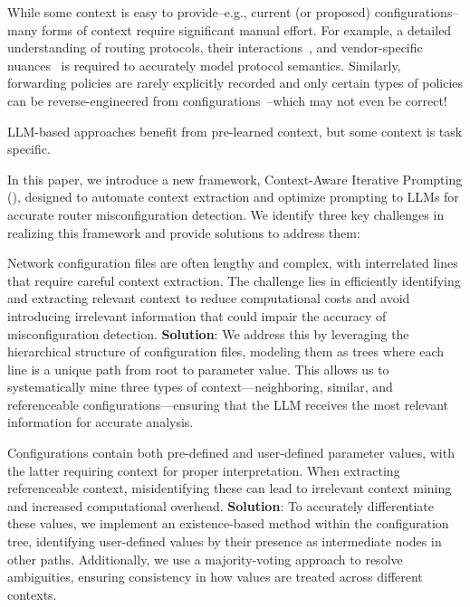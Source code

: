 While some context is easy to provide--e.g., current (or proposed) configurations--many forms of context require significant manual effort. For example, a detailed understanding of routing protocols, their interactions~\cite{le2007rr}, and vendor-specific nuances~\cite{birkner2021metha} is required to accurately model protocol semantics. Similarly, forwarding policies are rarely explicitly recorded and only certain types of policies can be reverse-engineered from configurations~\cite{birkner2020config2spec, kheradmand2020anime}--which may not even be correct!

LLM-based approaches benefit from pre-learned context, but some context is task specific. 

In this paper, we introduce a new framework, Context-Aware Iterative Prompting (\sysname{}), designed to automate context extraction and optimize prompting to LLMs for accurate router misconfiguration detection. We identify three key challenges in realizing this framework and provide solutions to address them:

Network configuration files are often lengthy and complex, with interrelated lines that require careful context extraction. The challenge lies in efficiently identifying and extracting relevant context to reduce computational costs and avoid introducing irrelevant information that could impair the accuracy of misconfiguration detection. \textbf{Solution}: We address this by leveraging the hierarchical structure of configuration files, modeling them as trees where each line is a unique path from root to parameter value. This allows us to systematically mine three types of context—neighboring, similar, and referenceable configurations—ensuring that the LLM receives the most relevant information for accurate analysis.

Configurations contain both pre-defined and user-defined parameter values, with the latter requiring context for proper interpretation. When extracting referenceable context, misidentifying these can lead to irrelevant context mining and increased computational overhead. \textbf{Solution}: To accurately differentiate these values, we implement an existence-based method within the configuration tree, identifying user-defined values by their presence as intermediate nodes in other paths. Additionally, we use a majority-voting approach to resolve ambiguities, ensuring consistency in how values are treated across different contexts.

